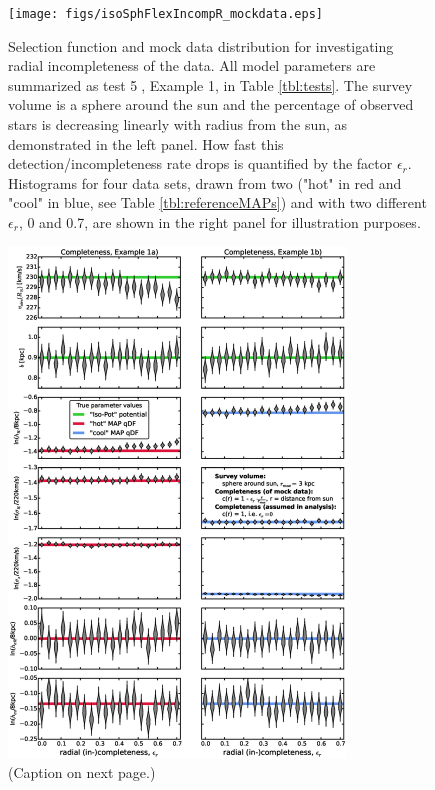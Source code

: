 
\begin{figure}
\texttt{[image: figs/isoSphFlexIncompR\_mockdata.eps]}
\caption{Selection function and mock data distribution for investigating radial incompleteness of the data. All model parameters are summarized as test \textcircled{5}, Example 1, in Table \ref{tbl:tests}. The survey volume is a sphere around the sun and the percentage of observed stars is decreasing linearly with radius from the sun, as demonstrated in the left panel. How fast this detection/incompleteness rate drops is quantified by the factor $\epsilon_r$. Histograms for four data sets, drawn from two \MAPs ("hot" in red and "cool" in blue, see Table \ref{tbl:referenceMAPs}) and with two different $\epsilon_r$, 0 and 0.7, are shown in the right panel for illustration purposes.} 
\label{fig:isoSphFlexIncompR_mockdata}
\end{figure}


\begin{figure}
\centering
\includegraphics[width=0.8\textwidth]{figs/isoSphFlexIncompR_violins.eps}
\caption{(Caption on next page.)}
\end{figure}


